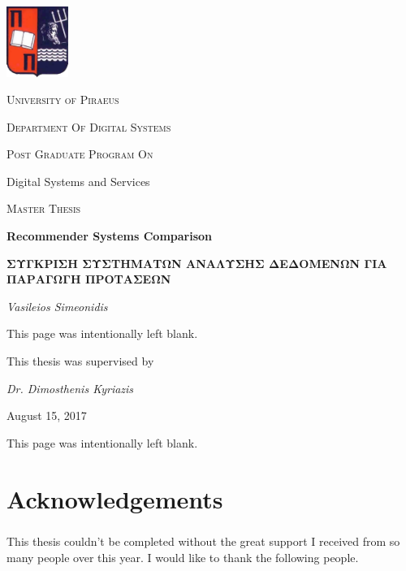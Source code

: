 \documentclass[12pt, a4paper, oneside, greek]{report}
\begin{document}
	\begin{titlepage}
		\centering
		\includegraphics[width=0.15\textwidth]{../images/UniversityOfPiraeusLogo.png}\par\vspace{1cm}
		{\scshape\LARGE University of Piraeus \par}
		\vspace{1cm}
		{\scshape\Large Department Of Digital Systems \par}
		\vspace{1cm}
		{\scshape\Large Post Graduate Program On \par Digital Systems and Services \par}
		\vspace{1cm}
		{\scshape\Large Master Thesis\par}
		\vspace{1cm}
		{\huge\bfseries Recommender Systems Comparison\par}
		\vspace{2cm}
		{\bfseries \large ΣΥΓΚΡΙΣΗ ΣΥΣΤΗΜΑΤΩΝ ΑΝΑΛΥΣΗΣ ΔΕΔΟΜΕΝΩΝ ΓΙΑ ΠΑΡΑΓΩΓΗ ΠΡΟΤΑΣΕΩΝ\par}
		\vfill
		{\Large\itshape Vasileios Simeonidis\par}
	\end{titlepage}
	
	\newpage
	\begin{center}
		This page was intentionally left blank.
	\end{center}
	\newpage 
	{
		\centering
		This thesis was supervised by\par
		\textit{Dr. Dimosthenis Kyriazis}
		\vfill
		{\large August 15, 2017\par}
	}
	\clearpage
	\begin{center}
		This page was intentionally left blank.
	\end{center}
	\newpage
	\chapter*{Acknowledgements}
	
	\paragraph{} This thesis couldn't be completed without the great support I received from so many people over this year. I would like to thank the following people.
	
\end{document}
